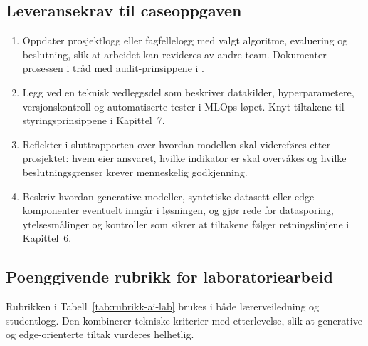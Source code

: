 \subsection{Leveransekrav til caseoppgaven}
\begin{enumerate}
    \item Oppdater prosjektlogg eller fagfellelogg med valgt algoritme, evaluering og beslutning, slik at arbeidet kan revideres
    av andre team. Dokumenter prosessen i tråd med audit-prinsippene i \citet{raji2020closing}.
    \item Legg ved en teknisk vedleggsdel som beskriver datakilder, hyperparametere, versjonskontroll og automatiserte tester i MLOps-løpet. Knyt tiltakene til styringsprinsippene i Kapittel~7.
    \item Reflekter i sluttrapporten over hvordan modellen skal videreføres etter prosjektet: hvem eier ansvaret, hvilke indikator
    er skal overvåkes og hvilke beslutningsgrenser krever menneskelig godkjenning.
    \item Beskriv hvordan generative modeller, syntetiske datasett eller edge-komponenter eventuelt inngår i løsningen, og gjør rede for datasporing, ytelsesmålinger og kontroller som sikrer at tiltakene følger retningslinjene i Kapittel~6.
\end{enumerate}

\subsection{Poenggivende rubrikk for laboratoriearbeid}
Rubrikken i Tabell~\ref{tab:rubrikk-ai-lab} brukes i både lærerveiledning og studentlogg. Den kombinerer tekniske kriterier med etterlevelse, slik at generative og edge-orienterte tiltak vurderes helhetlig.

